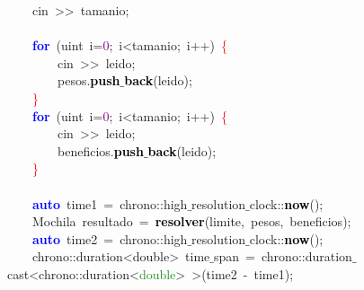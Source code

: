 \mbox{}\ \ \ \ cin\ \textcolor{BrickRed}{\textgreater{}\textgreater{}}\ tamanio\textcolor{BrickRed}{;} \\
\mbox{}\ \ \ \  \\
\mbox{}\ \ \ \ \textbf{\textcolor{Blue}{for}}\ \textcolor{BrickRed}{(}\textcolor{TealBlue}{uint}\ i\textcolor{BrickRed}{=}\textcolor{Purple}{0}\textcolor{BrickRed}{;}\ i\textcolor{BrickRed}{\textless{}}tamanio\textcolor{BrickRed}{;}\ i\textcolor{BrickRed}{++)}\ \textcolor{Red}{\{} \\
\mbox{}\ \ \ \ \ \ \ \ cin\ \textcolor{BrickRed}{\textgreater{}\textgreater{}}\ leido\textcolor{BrickRed}{;} \\
\mbox{}\ \ \ \ \ \ \ \ pesos\textcolor{BrickRed}{.}\textbf{\textcolor{Black}{push$\_$back}}\textcolor{BrickRed}{(}leido\textcolor{BrickRed}{);} \\
\mbox{}\ \ \ \ \textcolor{Red}{\}} \\
\mbox{}\ \ \ \ \textbf{\textcolor{Blue}{for}}\ \textcolor{BrickRed}{(}\textcolor{TealBlue}{uint}\ i\textcolor{BrickRed}{=}\textcolor{Purple}{0}\textcolor{BrickRed}{;}\ i\textcolor{BrickRed}{\textless{}}tamanio\textcolor{BrickRed}{;}\ i\textcolor{BrickRed}{++)}\ \textcolor{Red}{\{} \\
\mbox{}\ \ \ \ \ \ \ \ cin\ \textcolor{BrickRed}{\textgreater{}\textgreater{}}\ leido\textcolor{BrickRed}{;} \\
\mbox{}\ \ \ \ \ \ \ \ beneficios\textcolor{BrickRed}{.}\textbf{\textcolor{Black}{push$\_$back}}\textcolor{BrickRed}{(}leido\textcolor{BrickRed}{);} \\
\mbox{}\ \ \ \ \textcolor{Red}{\}} \\
\mbox{}\ \ \ \  \\
\mbox{}\ \ \ \ \textbf{\textcolor{Blue}{auto}}\ time1\ \textcolor{BrickRed}{=}\ chrono\textcolor{BrickRed}{::}high$\_$resolution$\_$clock\textcolor{BrickRed}{::}\textbf{\textcolor{Black}{now}}\textcolor{BrickRed}{();} \\
\mbox{}\ \ \ \ \textcolor{TealBlue}{Mochila}\ resultado\ \textcolor{BrickRed}{=}\ \textbf{\textcolor{Black}{resolver}}\textcolor{BrickRed}{(}limite\textcolor{BrickRed}{,}\ pesos\textcolor{BrickRed}{,}\ beneficios\textcolor{BrickRed}{);} \\
\mbox{}\ \ \ \ \textbf{\textcolor{Blue}{auto}}\ time2\ \textcolor{BrickRed}{=}\ chrono\textcolor{BrickRed}{::}high$\_$resolution$\_$clock\textcolor{BrickRed}{::}\textbf{\textcolor{Black}{now}}\textcolor{BrickRed}{();} \\
\mbox{}\ \ \ \ chrono\textcolor{BrickRed}{::}\textcolor{TealBlue}{duration\textless{}double\textgreater{}}\ time$\_$span\ \textcolor{BrickRed}{=}\ chrono\textcolor{BrickRed}{::}duration$\_$cast\textcolor{BrickRed}{\textless{}}chrono\textcolor{BrickRed}{::}duration\textcolor{BrickRed}{\textless{}}\textcolor{ForestGreen}{double}\textcolor{BrickRed}{\textgreater{}}\ \textcolor{BrickRed}{\textgreater{}(}time2\ \textcolor{BrickRed}{-}\ time1\textcolor{BrickRed}{);} \\
